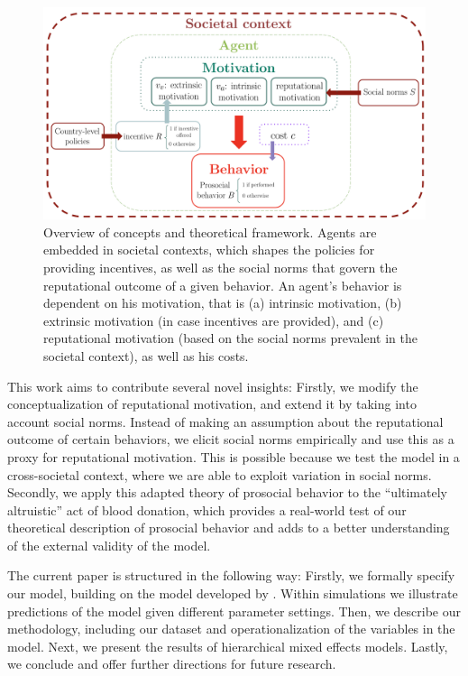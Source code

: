 \documentclass[AER]{AEA}
\begin{document}
\begin{figure}[h]
    \centering
    \includegraphics[width=\textwidth]{images/overview.png}
    \caption{Overview of concepts and theoretical framework. Agents are embedded in societal contexts, which shapes the policies for providing incentives, as well as the social norms that govern the reputational outcome of a given behavior. An agent’s behavior is dependent on his motivation, that is (a) intrinsic motivation, (b) extrinsic motivation (in case incentives are provided), and (c) reputational motivation (based on the social norms prevalent in the societal context), as well as his costs.}
    \label{fig:overview}
\end{figure}

This work aims to contribute several novel insights: Firstly, we modify the conceptualization of reputational motivation, and extend it by taking into account social norms. Instead of making an assumption about the reputational outcome of certain behaviors, we elicit social norms empirically and use this as a proxy for reputational motivation. This is possible because we test the model in a cross-societal context, where we are able to exploit variation in social norms. Secondly, we apply this adapted theory of prosocial behavior to the “ultimately altruistic” act of blood donation, which provides a real-world test of our theoretical description of prosocial behavior and adds to a better understanding of the external validity of the model.

The current paper is structured in the following way: Firstly, we formally specify our model, building on the model developed by \cite{benabou_incentives_2006}. Within simulations we illustrate predictions of the model given different parameter settings. Then, we describe our methodology, including our dataset and operationalization of the variables in the model. Next, we present the results of hierarchical mixed effects models. Lastly, we conclude and offer further directions for future research.
\end{document}
